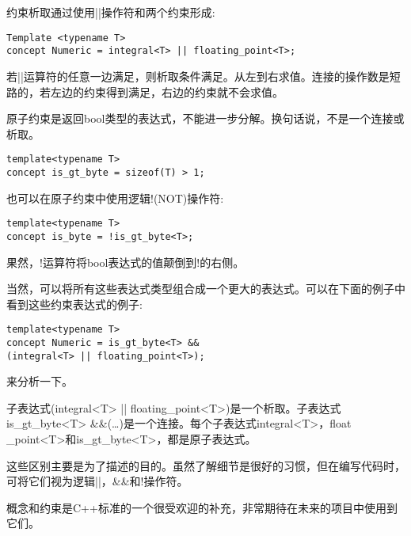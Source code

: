 约束析取通过使用||操作符和两个约束形成:

\begin{lstlisting}[style=styleCXX]
Template <typename T>
concept Numeric = integral<T> || floating_point<T>;
\end{lstlisting}

若||运算符的任意一边满足，则析取条件满足。从左到右求值。连接的操作数是短路的，若左边的约束得到满足，右边的约束就不会求值。

原子约束是返回bool类型的表达式，不能进一步分解。换句话说，不是一个连接或析取。

\begin{lstlisting}[style=styleCXX]
template<typename T>
concept is_gt_byte = sizeof(T) > 1;
\end{lstlisting}

也可以在原子约束中使用逻辑!(NOT)操作符:

\begin{lstlisting}[style=styleCXX]
template<typename T>
concept is_byte = !is_gt_byte<T>;
\end{lstlisting}

果然，!运算符将bool表达式的值颠倒到!的右侧。

当然，可以将所有这些表达式类型组合成一个更大的表达式。可以在下面的例子中看到这些约束表达式的例子:

\begin{lstlisting}[style=styleCXX]
template<typename T>
concept Numeric = is_gt_byte<T> &&
(integral<T> || floating_point<T>);
\end{lstlisting}

来分析一下。

子表达式(integral<T> || floating\_point<T>)是一个析取。子表达式is\_gt\_byte<T> \&\&(…)是一个连接。每个子表达式integral<T>，float \_point<T>和is\_gt\_byte<T>，都是原子表达式。

这些区别主要是为了描述的目的。虽然了解细节是很好的习惯，但在编写代码时，可将它们视为逻辑||，\&\&和!操作符。

概念和约束是C++标准的一个很受欢迎的补充，非常期待在未来的项目中使用到它们。







